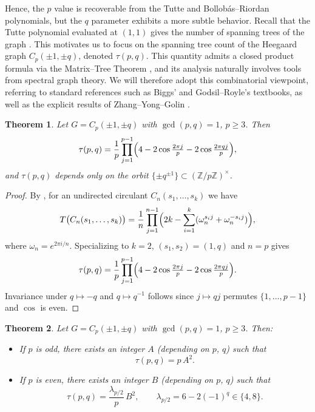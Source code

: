 \documentclass[pdflatex,sn-mathphys-num]{sn-jnl}%
\theoremstyle{plain}
\newtheorem{theorem}{Theorem}
\theoremstyle{definition}
\theoremstyle{remark}
\begin{document}
Hence, the $p$ value is recoverable from the Tutte and Bollobás--Riordan 
polynomials, but the $q$ parameter exhibits a more subtle behavior. 
Recall that the Tutte polynomial evaluated at $(1,1)$ gives the number 
of spanning trees of the graph  \cite[Prop. 3.1]{ellis-monaghan2022}. This motivates us to focus on the 
spanning tree count of the Heegaard graph $C_p(\pm1,\pm q)$, denoted 
$\tau(p,q)$. This quantity admits a closed product formula via the 
Matrix--Tree Theorem \cite{ZHANG2000337}, and its analysis naturally involves tools from 
spectral graph theory. We will therefore adopt this combinatorial 
viewpoint, referring to standard references such as Biggs’ 
\cite{biggs1974} and Godsil--Royle’s \cite{godsil2001} textbooks, 
as well as the explicit results of Zhang--Yong--Golin \cite{ZHANG2000337}.


\begin{theorem}\label{thm:product-and-parity}
Let $G=C_p(\pm 1,\pm q)$ with $\gcd(p,q)=1$, $p\ge3$. Then
\[
\tau(p,q)=\frac{1}{p}\prod_{j=1}^{p-1}\Bigl(4-2\cos\tfrac{2\pi j}{p}-2\cos\tfrac{2\pi q j}{p}\Bigr),
\]
and $\tau(p,q)$ depends only on the orbit $\{\pm q^{\pm1}\}\subset(\mathbb{Z}/p\mathbb{Z})^\times$.
\end{theorem}

\begin{proof}
By \cite[Lemma~1]{ZHANG2000337}, for an undirected circulant $C_n(s_1,\dots,s_k)$ we have
\[
T\bigl(C_n(s_1,\dots,s_k)\bigr)=\frac1n\prod_{j=1}^{n-1}\Bigl(2k-\sum_{i=1}^k(\omega_n^{s_i j}+\omega_n^{-s_i j})\Bigr),
\]
where $\omega_n=e^{2\pi i/n}$. Specializing to $k=2$, $(s_1,s_2)=(1,q)$ and $n=p$ gives
\[
\tau(p,q)=\frac1p\prod_{j=1}^{p-1}\Bigl(4-2\cos\tfrac{2\pi j}{p}-2\cos\tfrac{2\pi q j}{p}\Bigr).
\]
Invariance under $q\mapsto -q$ and $q\mapsto q^{-1}$ follows since $j\mapsto qj$ permutes $\{1,\dots,p-1\}$ and $\cos$ is even. 
\end{proof}


\begin{theorem}\label{thm:square-shape}
Let $G=C_p(\pm 1,\pm q)$ with $\gcd(p,q)=1$, $p\ge3$. Then:
\begin{itemize}
\item[\emph{(a)}] If $p$ is odd, there exists an integer $A$ (depending on $p$, $q$) such that
\[
\tau(p,q)=p\,A^2.
\]
\item[\emph{(b)}] If $p$ is even, there exists an integer $B$ (depending on $p$, $q$) such that
\[
\tau(p,q)=\frac{\lambda_{p/2}}{p}\,B^2,
\qquad \lambda_{p/2}=6-2(-1)^q\in\{4,8\}.
\]
\end{itemize}
\end{theorem}
\end{document}
